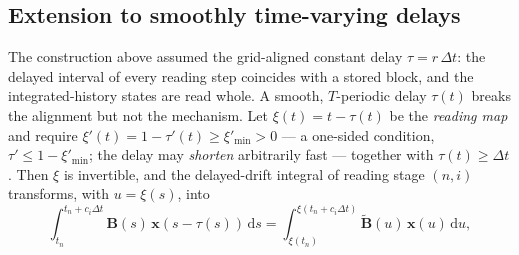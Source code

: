 \documentclass[preprint,12pt]{elsarticle}
\begin{document}
\subsection{Extension to smoothly time-varying delays}
\label{sec:colloc_tvd}
The construction above assumed the grid-aligned constant delay $\tau = r\,\Delta t$: the delayed interval of every reading step coincides with a stored block, and the integrated-history states are read whole. A smooth, $T$-periodic delay $\tau(t)$ breaks the alignment but not the mechanism. Let $\xi(t) = t - \tau(t)$ be the \emph{reading map} and require $\xi'(t) = 1 - \tau'(t) \ge \xi'_{\min} > 0$ --- a one-sided condition, $\tau' \le 1-\xi'_{\min}$; the delay may \emph{shorten} arbitrarily fast --- together with $\tau(t) \ge \Delta t$. Then $\xi$ is invertible, and the delayed-drift integral of reading stage $(n,i)$ transforms, with $u = \xi(s)$, into
\begin{equation}
\label{eq:tvd_read}
\int_{t_n}^{t_n + c_i \Delta t} \mathbf{B}(s)\,\mathbf{x}(s - \tau(s))\,\mathrm{d}s
= \int_{\xi(t_n)}^{\xi(t_n + c_i \Delta t)} \widetilde{\mathbf{B}}(u)\,\mathbf{x}(u)\,\mathrm{d}u,
\end{equation}
\end{document}
